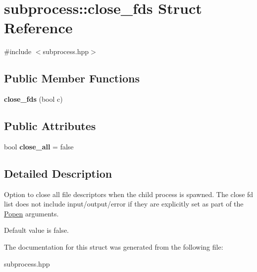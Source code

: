 \hypertarget{structsubprocess_1_1close__fds}{}\section{subprocess\+:\+:close\+\_\+fds Struct Reference}
\label{structsubprocess_1_1close__fds}


{\ttfamily \#include $<$subprocess.\+hpp$>$}

\subsection*{Public Member Functions}
\begin{DoxyCompactItemize}
\item 
\mbox{\label{structsubprocess_1_1close__fds_afc4b28318a4eb067d62f4d95e3c52c9d}} 
{\bfseries close\+\_\+fds} (bool c)
\end{DoxyCompactItemize}
\subsection*{Public Attributes}
\begin{DoxyCompactItemize}
\item 
\mbox{\label{structsubprocess_1_1close__fds_a5497e6ee62aa734579ad210045b6f004}} 
bool {\bfseries close\+\_\+all} = false
\end{DoxyCompactItemize}


\subsection{Detailed Description}
Option to close all file descriptors when the child process is spawned. The close fd list does not include input/output/error if they are explicitly set as part of the \hyperlink{classsubprocess_1_1Popen}{Popen} arguments.

Default value is false. 

The documentation for this struct was generated from the following file\+:\begin{DoxyCompactItemize}
\item 
subprocess.\+hpp\end{DoxyCompactItemize}
